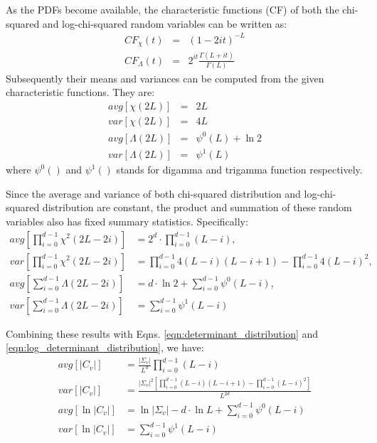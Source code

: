 \documentclass[journal]{IEEEtran}
\begin{document}
As the PDFs become available, the characteristic functions (CF) of both the chi-squared and log-chi-squared random variables
  can be written as:
  \begin{eqnarray}
    CF_\chi(t) &=& (1-2it)^{−L} \\ 
    CF_\Lambda(t) &=& 2^{it} \frac{\Gamma(L+it)}{\Gamma(L)} \label{eqn:log_chi_squared_characteristic_function}
  \end{eqnarray}
Subsequently their means and variances can be computed from the given characteristic functions.
They are:
  \begin{eqnarray}
    avg \left[ \chi(2L) \right]&=&2L \\
var \left[ \chi(2L) \right]&=&4L \\
avg \left[ \Lambda(2L) \right] &=& \psi^0(L) + \ln2 \\
var \left[ \Lambda(2L) \right] &=& \psi^1(L)
  \end{eqnarray}
  where $\psi^0()$ and $\psi^1()$ stands for digamma and trigamma function respectively.

Since the average and variance of both chi-squared distribution and log-chi-squared distribution are constant,
  the product and summation of these random variables also has fixed summary statistics.
Specifically:
\begin{align*}
  avg \left[ \prod^{d-1}_{i=0} \chi^2(2L-2i) \right] &= 2^d \cdot \prod^{d-1}_{i=0} (L-i), \\
  var \left[ \prod^{d-1}_{i=0} \chi^2(2L-2i) \right] &= \prod^{d-1}_{i=0} 4(L-i)(L-i+1) - \prod^{d-1}_{i=0} 4(L-i)^2, \\
  avg \left[ \sum^{d-1}_{i=0} \Lambda(2L-2i) \right] &= d \cdot \ln{2} + \sum^{d-1}_{i=0} \psi^0(L-i), \\
  var \left[ \sum^{d-1}_{i=0} \Lambda(2L-2i) \right] &= \sum^{d-1}_{i=0} \psi^1(L-i)
\end{align*}

Combining these results with Eqns. \ref{eqn:determinant_distribution} and \ref{eqn:log_determinant_distribution}, we have:
\begin{align}
  avg \left[ |C_v| \right]  &= \frac{|\Sigma_v|}{L^d} \prod^{d-1}_{i=0} (L-i)\\
  var \left[ |C_v| \right]  &=   \frac{|\Sigma_v|^2 \left[ \prod^{d-1}_{i=0} (L-i)(L-i+1) - \prod^{d-1}_{i=0} (L-i)^2 \right] }{L^{2d}} \label{eqn:var_det_is_heteroskedastic}\\
  avg \left[ \ln |C_v| \right] &= \ln |\Sigma_v| - d \cdot \ln{L}  + \sum^{d-1}_{i=0} \psi^0(L-i) \label{eqn:avg_log_det} \\
  var \left[ \ln |C_v| \right] &=  \sum^{d-1}_{i=0} \psi^1(L-i) \label{eqn:var_log_det_is_homoskedastic}
\end{align}
\end{document}
